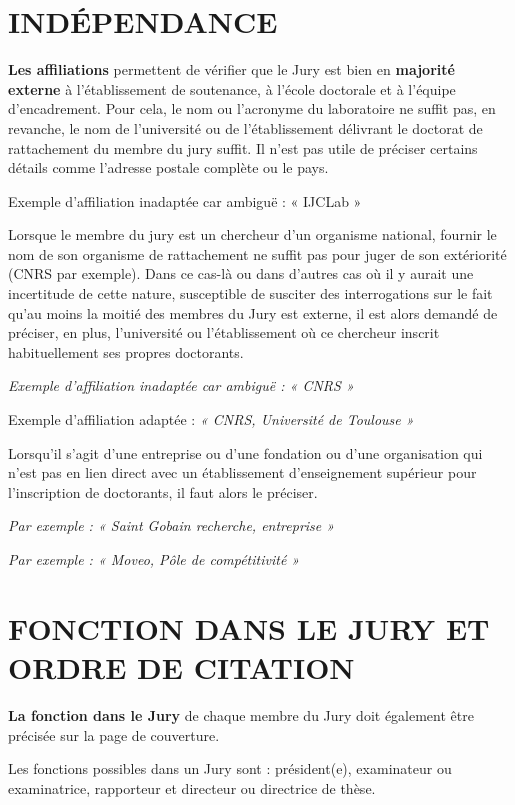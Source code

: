 \documentclass[french,12pt,a4paper]{book}
\begin{document}
\section{INDÉPENDANCE}
\textbf{Les affiliations} permettent de vérifier que le Jury est bien en \textbf{majorité externe} à l’établissement de soutenance, à l’école doctorale et à l’équipe d’encadrement. 
Pour cela, le nom ou l’acronyme du laboratoire ne suffit pas, en revanche, le nom de l’université ou de l’établissement délivrant le doctorat de rattachement du membre du jury suffit. Il n’est pas utile de préciser certains détails comme l’adresse postale complète ou le pays.\\ \par
Exemple d’affiliation inadaptée car ambiguë : « IJCLab »\\ \par
Lorsque le membre du jury est un chercheur d’un organisme national, fournir le nom de son organisme de rattachement ne suffit pas pour juger de son extériorité (CNRS par exemple). Dans ce cas-là ou dans d’autres cas où il y aurait une incertitude de cette nature, susceptible de susciter des interrogations sur le fait qu’au moins la moitié des membres du Jury est externe, il est alors demandé de préciser, en plus, l’université ou l’établissement où ce chercheur inscrit habituellement ses propres doctorants.\\ \par
\textit{Exemple d’affiliation inadaptée car ambiguë : « CNRS »}\\ \par
Exemple d’affiliation adaptée : \textit{« CNRS, Université de Toulouse »}\\ \par
Lorsqu’il s’agit d’une entreprise ou d’une fondation ou d’une organisation qui n’est pas en lien direct avec un établissement d’enseignement supérieur pour l’inscription de doctorants, il faut alors le préciser.\\ \par
\textit{Par exemple : « Saint Gobain recherche, entreprise »}\\ \par
\textit{Par exemple : « Moveo, Pôle de compétitivité »}
\newpage
\section{FONCTION DANS LE JURY ET ORDRE DE CITATION}
\textbf{La fonction dans le Jury} de chaque membre du Jury doit également être précisée sur la page de couverture.\\ \par
Les fonctions possibles dans un Jury sont : président(e), examinateur ou examinatrice, rapporteur et directeur ou directrice de thèse.
\end{document}
